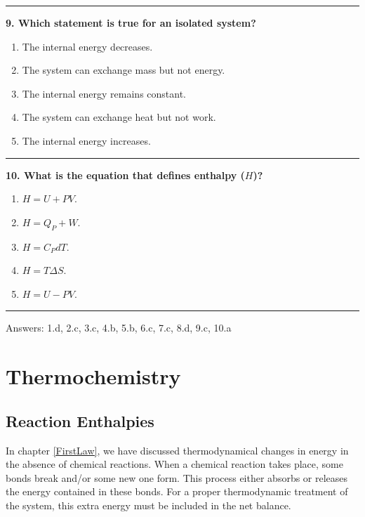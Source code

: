 \documentclass[
  9pt,
]{extbook}
\providecommand{\tightlist}{%
  \setlength{\itemsep}{0pt}\setlength{\parskip}{0pt}}
\theoremstyle{definition}
\theoremstyle{definition}
\theoremstyle{definition}
\theoremstyle{definition}
\theoremstyle{remark}
\begin{document}
\begin{center}\rule{0.5\linewidth}{0.5pt}\end{center}

\textbf{9. Which statement is true for an isolated system?}

\begin{enumerate}
\def\labelenumi{\alph{enumi}.}
\tightlist
\item
  The internal energy decreases.
\item
  The system can exchange mass but not energy.
\item
  The internal energy remains constant.
\item
  The system can exchange heat but not work.
\item
  The internal energy increases.
\end{enumerate}

\begin{center}\rule{0.5\linewidth}{0.5pt}\end{center}

\textbf{10. What is the equation that defines enthalpy (\(H\))?}

\begin{enumerate}
\def\labelenumi{\alph{enumi}.}
\tightlist
\item
  \(H = U + PV\).
\item
  \(H = Q_P + W\).
\item
  \(H = C_P dT\).
\item
  \(H = T \Delta S\).
\item
  \(H = U - PV\).
\end{enumerate}

\begin{center}\rule{0.5\linewidth}{0.5pt}\end{center}

Answers: 1.d, 2.c, 3.c, 4.b, 5.b, 6.c, 7.c, 8.d, 9.c, 10.a

\newcommand*{\standardstate}{{-\kern-6pt{\ominus}\kern-6pt-}}

\chapter{Thermochemistry}\label{Thermochemistry}

\section{Reaction Enthalpies}\label{rxnenthalpy}

In chapter \ref{FirstLaw}, we have discussed thermodynamical changes in energy in the absence of chemical reactions. When a chemical reaction takes place, some bonds break and/or some new one form. This process either absorbs or releases the energy contained in these bonds. For a proper thermodynamic treatment of the system, this extra energy must be included in the net balance.
\end{document}
